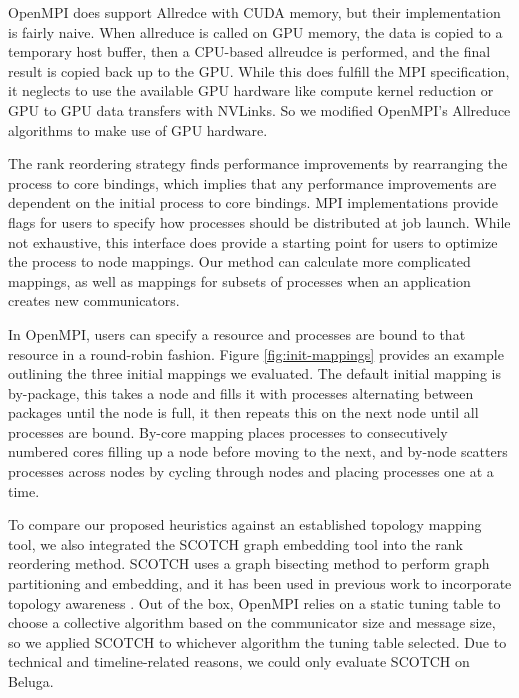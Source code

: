 OpenMPI does support Allredce with CUDA memory, but their implementation is fairly naive.
When allreduce is called on GPU memory, the data is copied to a temporary host buffer, then a CPU-based allreudce is performed, and the final result is copied back up to the GPU.
While this does fulfill the MPI specification, it neglects to use the available GPU hardware like compute kernel reduction or GPU to GPU data transfers with NVLinks.
So we modified OpenMPI's Allreduce algorithms to make use of GPU hardware. %

The rank reordering strategy finds performance improvements by rearranging the process to core bindings, which implies that any performance improvements are dependent on the initial process to core bindings.
MPI implementations provide flags for users to specify how processes should be distributed at job launch. 
While not exhaustive, this interface does provide a starting point for users to optimize the process to node mappings.
Our method can calculate more complicated mappings, as well as mappings for subsets of processes when an application creates new communicators.  

In OpenMPI, users can specify a resource and processes are bound to that resource in a round-robin fashion.
Figure \ref{fig:init-mappings} provides an example outlining the three initial mappings we evaluated.
The default initial mapping is by-package, this takes a node and fills it with processes alternating between packages until the node is full, it then repeats this on the next node until all processes are bound.
By-core mapping places processes to consecutively numbered cores filling up a node before moving to the next, and by-node scatters processes across nodes by cycling through nodes and placing processes one at a time.

To compare our proposed heuristics against an established topology mapping tool, we also integrated the SCOTCH graph embedding tool \cite{Pellegrini2012SCOTCH} into the rank reordering method.
SCOTCH uses a graph bisecting method to perform graph partitioning and embedding, and it has been used in previous work to incorporate topology awareness \cite{Mirsadeghi2016TopoAwareCollRR}.
Out of the box, OpenMPI relies on a static tuning table to choose a collective algorithm based on the communicator size and message size, so we applied SCOTCH to whichever algorithm the tuning table selected.
Due to technical and timeline-related reasons, we could only evaluate SCOTCH on Beluga.

